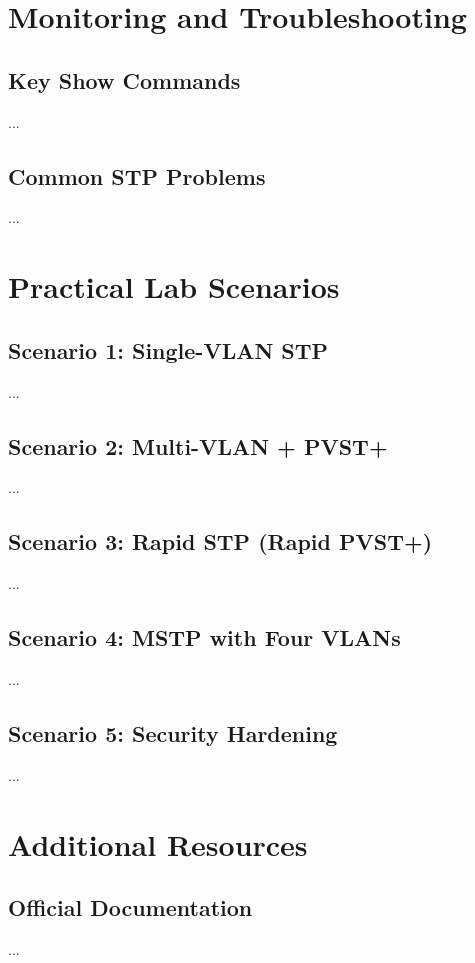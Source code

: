 \documentclass[a4paper]{report}
\begin{document}
\chapter{Monitoring and Troubleshooting}
\section{Key Show Commands}
...

\section{Common STP Problems}
...

\chapter{Practical Lab Scenarios}
\section{Scenario 1: Single-VLAN STP}
...

\section{Scenario 2: Multi-VLAN + PVST+}
...

\section{Scenario 3: Rapid STP (Rapid PVST+)}
...

\section{Scenario 4: MSTP with Four VLANs}
...

\section{Scenario 5: Security Hardening}
...

\chapter{Additional Resources}
\section{Official Documentation}
...
\end{document}
